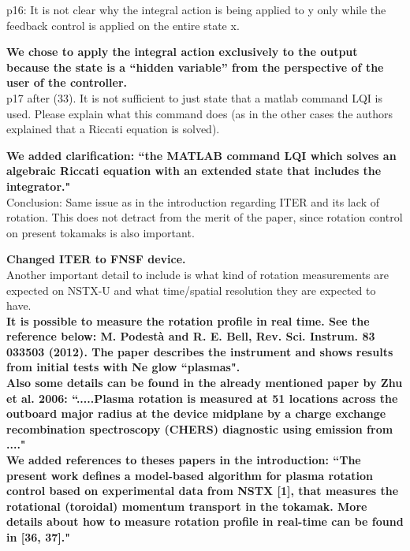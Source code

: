 \documentclass{scrartcl}
\newcommand{\response}[1]{\textcolor{red!80!black}{\bf #1}}
\begin{document}
p16: It is not clear why the integral action is being applied to y only while the feedback control is applied on the entire state x.

\response{We chose to apply the integral action exclusively to the output  because the state is a ``hidden variable'' from the perspective of the user of the controller.}\\

p17 after (33). It is not sufficient to just state that a matlab command LQI is used. Please explain what this command does (as in the other cases the authors explained that a Riccati equation is solved).

\response{We added clarification: ``the MATLAB command LQI which solves an algebraic Riccati equation with an extended state that includes the integrator."} \\

Conclusion: Same issue as in the introduction regarding ITER and its lack of rotation. This does not detract from the merit of the paper, since rotation control on present tokamaks is also important.

\response{Changed ITER to FNSF device.} \\

Another important detail to include is what kind of rotation measurements are expected on NSTX-U and what time/spatial resolution they are expected to have. \\
\response{It is possible to measure the rotation profile in real time. See the reference below:
M. Podest\`a and R. E. Bell, Rev. Sci. Instrum. 83 033503 (2012).
The paper describes the instrument and shows results from initial tests with Ne glow ``plasmas".\\
Also some details can be found in the already mentioned paper by Zhu et al. 2006:
``.....Plasma rotation is measured at 51 locations across the outboard major radius at the device midplane by a charge exchange recombination spectroscopy (CHERS) diagnostic using emission from ...."\\
We added references to theses papers in the introduction:
``The present work defines a model-based algorithm for plasma rotation control based on experimental data from NSTX [1], that measures the rotational (toroidal) momentum transport in the tokamak. More details about how to measure rotation profile in real-time can be found in [36, 37]."} \\
\end{document}
